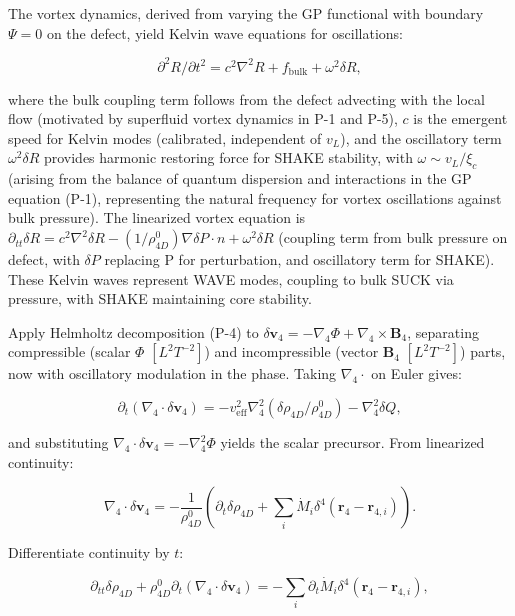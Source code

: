 The vortex dynamics, derived from varying the GP functional with boundary $\Psi=0$ on the defect, yield Kelvin wave equations for oscillations:

\begin{equation}
\partial^2 R / \partial t^2 = c^2 \nabla^2 R + f_{\text{bulk}} + \omega^2 \delta R,
\end{equation}

where the bulk coupling term follows from the defect advecting with the local flow (motivated by superfluid vortex dynamics in P-1 and P-5), $c$ is the emergent speed for Kelvin modes (calibrated, independent of $v_L$), and the oscillatory term $\omega^2 \delta R$ provides harmonic restoring force for SHAKE stability, with $\omega \sim v_L / \xi_c$ (arising from the balance of quantum dispersion and interactions in the GP equation (P-1), representing the natural frequency for vortex oscillations against bulk pressure). The linearized vortex equation is $\partial_{tt} \delta R = c^2 \nabla^2 \delta R - (1 / \rho_{4D}^0) \nabla \delta P \cdot n + \omega^2 \delta R$ (coupling term from bulk pressure on defect, with $\delta P$ replacing P for perturbation, and oscillatory term for SHAKE). These Kelvin waves represent WAVE modes, coupling to bulk SUCK via pressure, with SHAKE maintaining core stability.

Apply Helmholtz decomposition (P-4) to $\delta \mathbf{v}_4 = -\nabla_4 \Phi + \nabla_4 \times \mathbf{B}_4$, separating compressible (scalar $\Phi$ $[L^2 T^{-2}]$) and incompressible (vector $\mathbf{B}_4$ $[L^2 T^{-2}]$) parts, now with oscillatory modulation in the phase. Taking $\nabla_4 \cdot$ on Euler gives:

\begin{equation}
\partial_t (\nabla_4 \cdot \delta \mathbf{v}_4) = -v_{\text{eff}}^2 \nabla_4^2 (\delta \rho_{4D} / \rho_{4D}^0) - \nabla_4^2 \delta Q,
\end{equation}

and substituting $\nabla_4 \cdot \delta \mathbf{v}_4 = -\nabla_4^2 \Phi$ yields the scalar precursor. From linearized continuity:

\begin{equation}
\nabla_4 \cdot \delta \mathbf{v}_4 = -\frac{1}{\rho_{4D}^0} \left( \partial_t \delta \rho_{4D} + \sum_i \dot{M}_i \delta^4(\mathbf{r}_4 - \mathbf{r}_{4,i}) \right).
\end{equation}

Differentiate continuity by $t$:

\begin{equation}
\partial_{tt} \delta \rho_{4D} + \rho_{4D}^0 \partial_t (\nabla_4 \cdot \delta \mathbf{v}_4) = -\sum_i \partial_t \dot{M}_i \delta^4(\mathbf{r}_4 - \mathbf{r}_{4,i}),
\end{equation}

